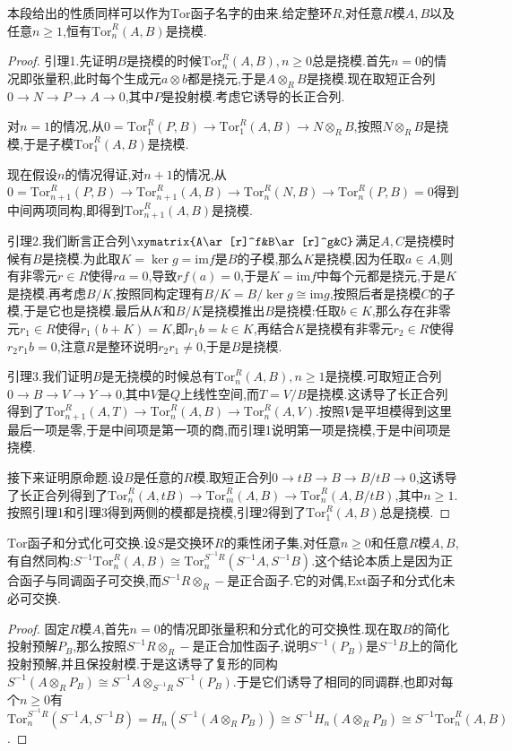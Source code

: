 本段给出的性质同样可以作为$\mathrm{Tor}$函子名字的由来.给定整环$R$,对任意$R$模$A,B$以及任意$n\ge1$,恒有$\mathrm{Tor}_n^R(A,B)$是挠模.
\begin{proof}
	
	引理1.先证明$B$是挠模的时候$\mathrm{Tor}_n^R(A,B),n\ge0$总是挠模.首先$n=0$的情况即张量积,此时每个生成元$a\otimes b$都是挠元,于是$A\otimes_RB$是挠模.现在取短正合列$0\to N\to P\to A\to0$,其中$P$是投射模.考虑它诱导的长正合列.
	
	对$n=1$的情况,从$0=\mathrm{Tor}_1^R(P,B)\to\mathrm{Tor}_1^R(A,B)\to N\otimes_RB$,按照$N\otimes_RB$是挠模,于是子模$\mathrm{Tor}_1^R(A,B)$是挠模.
	
	现在假设$n$的情况得证,对$n+1$的情况,从$0=\mathrm{Tor}_{n+1}^R(P,B)\to\mathrm{Tor}_{n+1}^R(A,B)\to\mathrm{Tor}_n^R(N,B)\to\mathrm{Tor}_n^R(P,B)=0$得到中间两项同构,即得到$\mathrm{Tor}_{n+1}^R(A,B)$是挠模.
	
	引理2.我们断言正合列$\xymatrix{A\ar[r]^f&B\ar[r]^g&C}$满足$A,C$是挠模时候有$B$是挠模.为此取$K=\ker g=\mathrm{im}f$是$B$的子模,那么$K$是挠模,因为任取$a\in A$,则有非零元$r\in R$使得$ra=0$,导致$rf(a)=0$,于是$K=\mathrm{im}f$中每个元都是挠元,于是$K$是挠模.再考虑$B/K$,按照同构定理有$B/K=B/\ker g\cong\mathrm{im}g$,按照后者是挠模$C$的子模,于是它也是挠模.最后从$K$和$B/K$是挠模推出$B$是挠模:任取$b\in K$,那么存在非零元$r_1\in R$使得$r_1(b+K)=K$,即$r_1b=k\in K$,再结合$K$是挠模有非零元$r_2\in R$使得$r_2r_1b=0$,注意$R$是整环说明$r_2r_1\not=0$,于是$B$是挠模.
	
	引理3.我们证明$B$是无挠模的时候总有$\mathrm{Tor}_n^R(A,B),n\ge1$是挠模.可取短正合列$0\to B\to V\to Y\to0$,其中$V$是$Q$上线性空间,而$T=V/B$是挠模.这诱导了长正合列得到了$\mathrm{Tor}_{n+1}^R(A,T)\to\mathrm{Tor}_n^R(A,B)\to\mathrm{Tor}_n^R(A,V)$.按照$V$是平坦模得到这里最后一项是零,于是中间项是第一项的商,而引理1说明第一项是挠模,于是中间项是挠模.
	
	接下来证明原命题.设$B$是任意的$R$模.取短正合列$0\to tB\to B\to B/tB\to0$,这诱导了长正合列得到了$\mathrm{Tor}_n^R(A,tB)\to\mathrm{Tor}_m^R(A,B)\to\mathrm{Tor}_n^R(A,B/tB)$,其中$n\ge1$.按照引理1和引理3得到两侧的模都是挠模,引理2得到了$\mathrm{Tor}_1^R(A,B)$总是挠模.
\end{proof}

$\mathrm{Tor}$函子和分式化可交换.设$S$是交换环$R$的乘性闭子集,对任意$n\ge0$和任意$R$模$A,B$,有自然同构:$S^{-1}\mathrm{Tor}_n^R(A,B)\cong\mathrm{Tor}_n^{S^{-1}R}(S^{-1}A,S^{-1}B)$.这个结论本质上是因为正合函子与同调函子可交换,而$S^{-1}R\otimes_R-$是正合函子.它的对偶,$\mathrm{Ext}$函子和分式化未必可交换.
\begin{proof}
	
	固定$R$模$A$,首先$n=0$的情况即张量积和分式化的可交换性.现在取$B$的简化投射预解$P_B$,那么按照$S^{-1}R\otimes_R-$是正合加性函子,说明$S^{-1}(P_B)$是$S^{-1}B$上的简化投射预解,并且保投射模.于是这诱导了复形的同构$S^{-1}(A\otimes_RP_B)\cong S^{-1}A\otimes_{S^{-1}R}S^{-1}(P_B)$.于是它们诱导了相同的同调群,也即对每个$n\ge0$有$\mathrm{Tor}_n^{S^{-1}R}(S^{-1}A,S^{-1}B)=H_n(S^{-1}(A\otimes_RP_B))\cong S^{-1}H_n(A\otimes_RP_B)\cong S^{-1}\mathrm{Tor}_n^R(A,B)$.
\end{proof}

